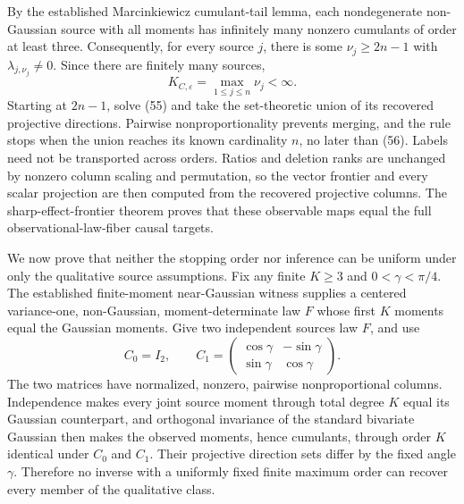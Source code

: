 By the established Marcinkiewicz cumulant-tail lemma, each nondegenerate non-Gaussian source with all moments has infinitely many nonzero cumulants of order at least three. Consequently, for every source \(j\), there is some \(\nu_j\ge2n-1\) with \(\lambda_{j,\nu_j}\ne0\). Since there are finitely many sources,
\[
 K_{C,\varepsilon}=\max_{1\le j\le n}\nu_j<\infty. \tag{56}
\]
Starting at \(2n-1\), solve (55) and take the set-theoretic union of its recovered projective directions. Pairwise nonproportionality prevents merging, and the rule stops when the union reaches its known cardinality \(n\), no later than (56). Labels need not be transported across orders. Ratios and deletion ranks are unchanged by nonzero column scaling and permutation, so the vector frontier and every scalar projection are then computed from the recovered projective columns. The sharp-effect-frontier theorem proves that these observable maps equal the full observational-law-fiber causal targets.

We now prove that neither the stopping order nor inference can be uniform under only the qualitative source assumptions. Fix any finite \(K\ge3\) and \(0<\gamma<\pi/4\). The established finite-moment near-Gaussian witness supplies a centered variance-one, non-Gaussian, moment-determinate law \(F\) whose first \(K\) moments equal the Gaussian moments. Give two independent sources law \(F\), and use
\[
 C_0=I_2,
 \qquad
 C_1=\begin{pmatrix}\cos\gamma&-\sin\gamma\\
 \sin\gamma&\cos\gamma\end{pmatrix}. \tag{57}
\]
The two matrices have normalized, nonzero, pairwise nonproportional columns. Independence makes every joint source moment through total degree \(K\) equal its Gaussian counterpart, and orthogonal invariance of the standard bivariate Gaussian then makes the observed moments, hence cumulants, through order \(K\) identical under \(C_0\) and \(C_1\). Their projective direction sets differ by the fixed angle \(\gamma\). Therefore no inverse with a uniformly fixed finite maximum order can recover every member of the qualitative class.

